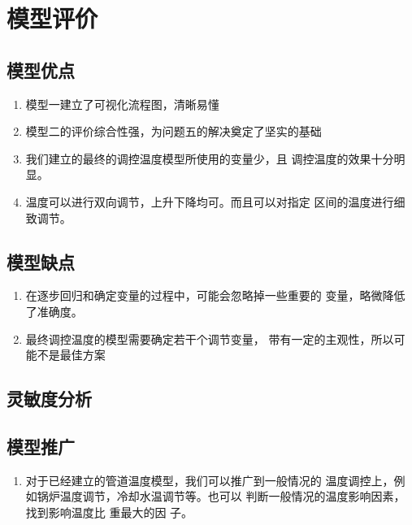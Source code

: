\section{模型评价}
    \subsection{模型优点}
        \begin{enumerate}
            \item 模型一建立了可视化流程图，清晰易懂
            \item 模型二的评价综合性强，为问题五的解决奠定了坚实的基础
            \item 我们建立的最终的调控温度模型所使用的变量少，且
                  调控温度的效果十分明显。
            \item 温度可以进行双向调节，上升下降均可。而且可以对指定
                  区间的温度进行细致调节。
        \end{enumerate}
    \subsection{模型缺点}
        \begin{enumerate}
            \item 在逐步回归和确定变量的过程中，可能会忽略掉一些重要的
                  变量，略微降低了准确度。
            \item 最终调控温度的模型需要确定若干个调节变量，
                  带有一定的主观性，所以可能不是最佳方案
        \end{enumerate}
    \subsection{灵敏度分析}
    \subsection{模型推广}
        \begin{enumerate}
            \item 对于已经建立的管道温度模型，我们可以推广到一般情况的
                  温度调控上，例如锅炉温度调节，冷却水温调节等。也可以
                  判断一般情况的温度影响因素，找到影响温度比 重最大的因
                  子。
        \end{enumerate}